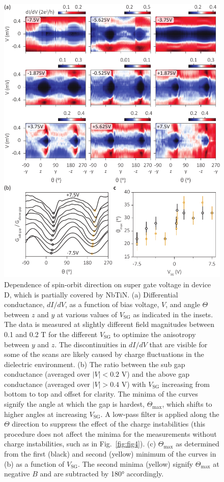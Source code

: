 \begin{figure}
\begin{center}
\centering
\includegraphics[width=\columnwidth]{chapter_spinorbit/figures/SFig5_SGdep_half_updated.pdf}
\caption{\label{fig:SGdep}
Dependence of spin-orbit direction on super gate voltage in device D, which is partially covered by NbTiN.
(a) Differential conductance, $dI/dV$, as a function of bias voltage, $V$, and angle $\Theta$ between $z$ and $y$ at various values of $V_{\mathrm{SG}}$ as indicated in the insets.
The data is measured at slightly different field magnitudes between 0.1 and 0.2 T for the different $V_{\mathrm{SG}}$ to optimize the anisotropy between $y$ and $z$.
The discontinuities in $dI/dV$ that are visible for some of the scans are likely caused by charge fluctuations in the dielectric environment.
(b) The ratio between the sub gap conductance (averaged over $|V| < 0.2$ V) and the above gap conductance (averaged over $|V| > 0.4$ V) with $V_{\mathrm{SG}}$ increasing from bottom to top and offset for clarity.
The minima of the curves signify the angle at which the gap is hardest, $\Theta_{\mathrm{max}}$, which shifts to higher angles at increasing $V_{\mathrm{SG}}$.
A low-pass filter is applied along the $\Theta$ direction to suppress the effect of the charge instabilities (this procedure does not affect the minima for the measurements without charge instabilities, such as in Fig.~\ref{fig:fig4}).
(c) $\Theta_{\mathrm{max}}$ as determined from the first (black) and second (yellow) minimum of the curves in (b) as a function of $V_{\mathrm{SG}}$.
The second minima (yellow) signify $\Theta_{\mathrm{max}}$ at negative $B$ and are subtracted by \ang{180} accordingly.
}
\end{center}
\end{figure}

